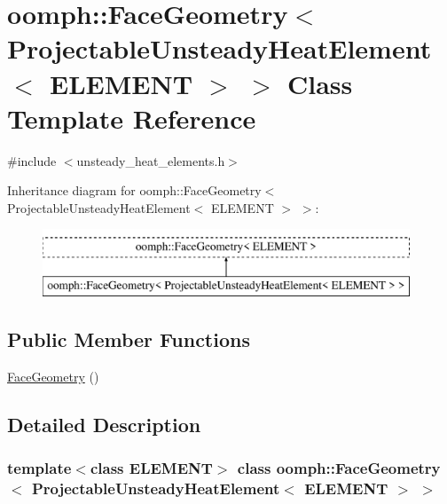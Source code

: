 \hypertarget{classoomph_1_1FaceGeometry_3_01ProjectableUnsteadyHeatElement_3_01ELEMENT_01_4_01_4}{}\section{oomph\+:\+:Face\+Geometry$<$ Projectable\+Unsteady\+Heat\+Element$<$ E\+L\+E\+M\+E\+NT $>$ $>$ Class Template Reference}
\label{classoomph_1_1FaceGeometry_3_01ProjectableUnsteadyHeatElement_3_01ELEMENT_01_4_01_4}


{\ttfamily \#include $<$unsteady\+\_\+heat\+\_\+elements.\+h$>$}

Inheritance diagram for oomph\+:\+:Face\+Geometry$<$ Projectable\+Unsteady\+Heat\+Element$<$ E\+L\+E\+M\+E\+NT $>$ $>$\+:\begin{figure}[H]
\begin{center}
\leavevmode
\includegraphics[height=2.000000cm]{classoomph_1_1FaceGeometry_3_01ProjectableUnsteadyHeatElement_3_01ELEMENT_01_4_01_4}
\end{center}
\end{figure}
\subsection*{Public Member Functions}
\begin{DoxyCompactItemize}
\item 
\hyperlink{classoomph_1_1FaceGeometry_3_01ProjectableUnsteadyHeatElement_3_01ELEMENT_01_4_01_4_ac3fab47aafbb7bad5d21e95ad6ab119a}{Face\+Geometry} ()
\end{DoxyCompactItemize}


\subsection{Detailed Description}
\subsubsection*{template$<$class E\+L\+E\+M\+E\+NT$>$\newline
class oomph\+::\+Face\+Geometry$<$ Projectable\+Unsteady\+Heat\+Element$<$ E\+L\+E\+M\+E\+N\+T $>$ $>$}

